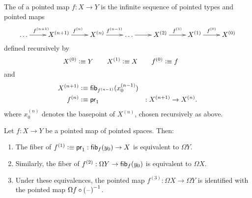 \documentclass[hott-all.tex]{subfiles}
\begin{document}
\begin{defn}
  The 
  of a pointed map $f:X\to Y$ is the infinite sequence of pointed types and pointed maps
  \[\xymatrix{\dots \ar[r]^{f^{(n+1)}} & X^{(n+1)} \ar[r]^{f^{(n)}} & X^{(n)} \ar^-{f^{(n-1)}}[r] & \dots \ar[r] & X^{(2)} \ar^-{f^{(1)}}[r] & X^{(1)} \ar[r]^{f^{(0)}} & X^{(0)}}\]
  defined recursively by
  \[ X^{(0)} \vcentcolon\equiv Y\qquad
    X^{(1)} \vcentcolon\equiv X\qquad
    f^{(0)} \vcentcolon\equiv f\qquad
    \]
  and
  \begin{alignat*}{2}
    X^{(n+1)} &\vcentcolon\equiv {\mathsf{fib}}_{f^{(n-1)}}(x^{(n-1)}_0)\\
    f^{(n)} &\vcentcolon\equiv \mathsf{pr}_{1} &: X^{(n+1)} \to X^{(n)}.
  \end{alignat*}
  where $x^{(n)}_0$ denotes the basepoint of $X^{(n)}$, chosen recursively as above.
\end{defn}
% 
% 
\begin{lem}
  Let $f:X\to Y$ be a pointed map of pointed spaces.  Then:
  \begin{enumerate}
  \item The fiber of $f^{(1)}\vcentcolon\equiv \mathsf{pr}_{1} : {\mathsf{fib}}_{f}(y_0) \to X$ is equivalent to $\Omega Y$.
  \item Similarly, the fiber of $f^{(2)} : \Omega Y \to {\mathsf{fib}}_{f}(y_0)$ is equivalent to $\Omega X$.
  \item Under these equivalences, the pointed map $f^{(3)} : \Omega X\to \Omega Y$ is identified with the pointed map $\Omega f\circ\mathord{{(\mathord{\hspace{1pt}\text{--}\hspace{1pt}})}^{-1}}$.
  \end{enumerate}
\end{lem}
\end{document}

